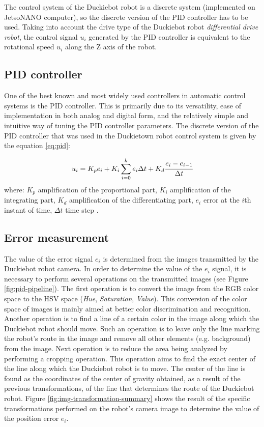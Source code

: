 \documentclass[conference]{IEEEtran}
\begin{document}
The control system of the Duckiebot robot is a discrete system (implemented on JetsoNANO computer), so the discrete version of the PID controller has to be used. Taking into account the drive type of the Duckiebot robot \emph{differential drive robot}, the control signal $u_i$ generated by the PID controller is equivalent to the rotational speed $u_i$ along the Z axis of the robot.

\subsection{PID controller}
One of the best known and most widely used controllers in automatic control systems is the PID controller. This is primarily due to its versatility, ease of implementation in both analog and digital form, and the relatively simple and intuitive way of tuning the PID controller parameters. The discrete version of the PID controller that was used in the Duckietown robot control system is given by the equation \eqref{eq:pid}:

\begin{equation}
u_i = K_p e_i + K_i \sum_{i=0}^k{e_i \Delta t} + K_d \cfrac{e_i-e_{i-1}}{\Delta t}
\label{eq:pid}
\end{equation}
where: $K_p$ amplification of the proportional part, $K_i$ amplification of the integrating part, $K_d$ amplification of the differentiating part, $e_i$ error at the $i$th instant of time, $\Delta t$ time step \cite{aastrom2021feedback}.

\subsection{Error measurement}
The value of the error signal $e_i$ is determined from the images transmitted by the Duckiebot robot camera. In order to determine the value of the $e_i$ signal, it is necessary to perform several operations on the transmitted images (see Figure \ref{fig:pid-pipeline}). 
The first operation is to convert the image from the RGB color space to the HSV space (\emph{Hue}, \emph{Saturation}, \emph{Value}). This conversion of the color space of images is mainly aimed at better color discrimination and recognition. 
Another operation is to find a line of a certain color in the image along which the Duckiebot robot should move. Such an operation is to leave only the line marking the robot's route in the image and remove all other elements (e.g. background) from the image. 
Next operation is to reduce the area being analyzed by performing a cropping operation. This operation aims to find the exact center of the line along which the Duckiebot robot is to move. 
The center of the line is found as the coordinates of the center of gravity obtained, as a result of the previous transformations, of the line that determines the route of the Duckiebot robot. Figure \ref{fig:img-transformation-summary} shows the result of the specific transformations performed on the robot's camera image to determine the value of the position error $e_i$.
\end{document}
